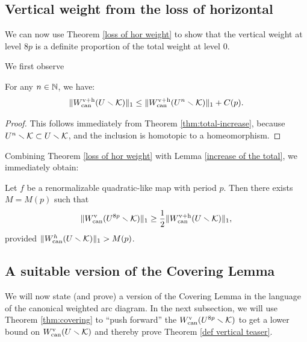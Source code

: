 
\subsection{Vertical weight from the loss of horizontal} \label{subsec:vert-from-hor-loss}
We can now use Theorem \ref{loss of hor weight} to show that the vertical weight at level $8p$ is a definite proportion of the total weight at level 0. 

We first observe
\begin{lem}\label{increase of the total}
 For any $n\in {\Bbb N}$,
we have:
$$
  \| W_{\mathrm{can}}^{{\mathrm{v}}+{\mathrm{h}}}(U \smallsetminus {\mathcal K})\|_1 \leq \| W_{\mathrm{can}}^{{\mathrm{v}}+{\mathrm{h}}}(U^n \smallsetminus {\mathcal K})\|_1+ C(p).
$$
\end{lem}
\begin{proof}
This follows immediately from Theorem \ref{thm:total-increase},
because $U^n \smallsetminus {\mathcal K} \subset U \smallsetminus {\mathcal K}$,
and the inclusion is homotopic to a homeomorphism. 
\end{proof}

Combining Theorem \ref{loss of hor weight} with Lemma \ref{increase of the total}, we immediately obtain:
\begin{lemma} \label{separation property}
 Let $f$ be a renormalizable quadratic-like map with period $p$.
Then there exists $M=M(p)$ such that
$$
     \| W^{\mathrm{v}}_{\mathrm{can}}(U^{8p}\smallsetminus {\mathcal K})\|_1 \geq  \frac{1}{2}  \| W_{\mathrm{can}}^{{\mathrm{v}}+{\mathrm{h}}}(U \smallsetminus {\mathcal K}) \|_1 ,
$$
provided $ \| W_{\mathrm{can}}^h (U\smallsetminus {\mathcal K})\|_1>M(p)$.
\end{lemma}

\subsection{A suitable version of the Covering Lemma} \label{subsec:covering-lemma}
We will now state (and prove) a version of the Covering Lemma\cite{covering lemma} in the language of the canonical weighted arc diagram. In the next subsection, we will use Theorem \ref{thm:covering} to ``push forward'' the $W_{\operatorname{can}}^{\mathrm{v}}(U^{8p} \smallsetminus {\mathcal K})$ 
to get a lower bound on $W_{\operatorname{can}}^{\mathrm{v}}(U \smallsetminus {\mathcal K})$ and thereby prove Theorem \ref{def vertical teaser}.

